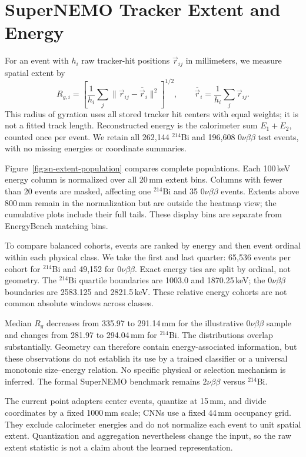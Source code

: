 \section{SuperNEMO Tracker Extent and Energy}
\label{app:raw-observations}

For an event with $h_i$ raw tracker-hit positions $\vec{r}_{ij}$ in
millimeters, we measure spatial extent by
\begin{equation}
 R_{g,i}=\left[\frac{1}{h_i}\sum_j
 \|\vec{r}_{ij}-\overline{\vec{r}}_i\|^2\right]^{1/2},
 \qquad \overline{\vec{r}}_i=\frac{1}{h_i}\sum_j\vec{r}_{ij}.
\end{equation}
This radius of gyration uses all stored tracker hit centers with equal
weights; it is not a fitted track length. Reconstructed energy is the
calorimeter sum $E_1+E_2$, counted once per event. We retain all 262,144
$^{214}$Bi and 196,608 $0\nu\beta\beta$ test events, with no missing
energies or coordinate summaries.

Figure~\ref{fig:sn-extent-population} compares complete populations.
Each 100\,keV energy column is normalized over all 20\,mm extent bins.
Columns with fewer than 20 events are masked, affecting one $^{214}$Bi
and 35 $0\nu\beta\beta$ events. Extents above 800\,mm remain in the
normalization but are outside the heatmap view; the cumulative plots
include their full tails. These display bins are separate from EnergyBench
matching bins.

To compare balanced cohorts, events are ranked by energy and then event
ordinal within each physical class. We take the first and last quarter:
65,536 events per cohort for $^{214}$Bi and 49,152 for $0\nu\beta\beta$.
Exact energy ties are split by ordinal, not geometry. The $^{214}$Bi
quartile boundaries are 1003.0 and 1870.25\,keV; the $0\nu\beta\beta$
boundaries are 2583.125 and 2821.5\,keV. These relative energy cohorts
are not common absolute windows across classes.

Median $R_g$ decreases from 335.97 to 291.14\,mm for the illustrative
$0\nu\beta\beta$ sample and changes from 281.97 to 294.04\,mm for
$^{214}$Bi. The distributions overlap substantially. Geometry can
therefore contain energy-associated information, but these observations
do not establish its use by a trained classifier or a universal
monotonic size--energy relation. No specific physical or selection
mechanism is inferred. The formal SuperNEMO benchmark remains
$2\nu\beta\beta$ versus $^{214}$Bi.

The current point adapters center events, quantize at 15\,mm, and divide
coordinates by a fixed 1000\,mm scale; CNNs use a fixed 44\,mm occupancy
grid. They exclude calorimeter energies and do not normalize each event
to unit spatial extent. Quantization and aggregation nevertheless change
the input, so the raw extent statistic is not a claim about the learned
representation.


